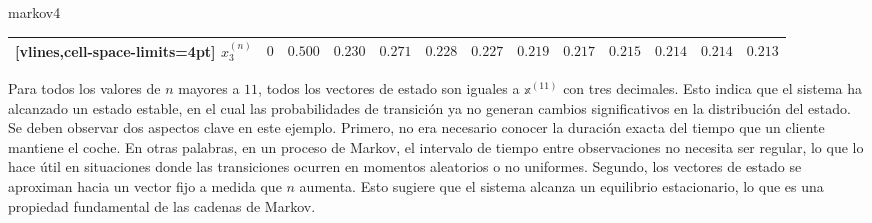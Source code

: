 \begin{examplebox}{}{markov4}
\begin{adjustwidth}{-7.5cm}{-2cm}
\begin{NiceTabular}{ccccccccccccc}[vlines,cell-space-limits=4pt]
            $x_3^{(n)}$ & $0$ & $0.500$ & $0.230$ & $0.271$ & $0.228$ & $0.227$ & $0.219$ & $0.217$ & $0.215$ & $0.214$ & $0.214$ & $0.213$ \\
            \hline
        \end{NiceTabular} \vspace{0.3cm}
    \end{adjustwidth}
    Para todos los valores de $n$ mayores a $11$, todos los vectores de estado son iguales a $\mathbb{x}^{(11)}$ con tres decimales. Esto indica que el sistema ha alcanzado un estado estable, en el cual las probabilidades de transición ya no generan cambios significativos en la distribución del estado. Se deben observar dos aspectos clave en este ejemplo. Primero, no era necesario conocer la duración exacta del tiempo que un cliente mantiene el coche. En otras palabras, en un proceso de Markov, el intervalo de tiempo entre observaciones no necesita ser regular, lo que lo hace útil en situaciones donde las transiciones ocurren en momentos aleatorios o no uniformes. Segundo, los vectores de estado se aproximan hacia un vector fijo a medida que $n$ aumenta. Esto sugiere que el sistema alcanza un equilibrio estacionario, lo que es una propiedad fundamental de las cadenas de Markov.
\end{examplebox}

